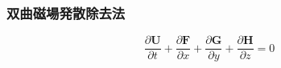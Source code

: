 








\clearpage
\subsubsection{双曲磁場発散除去法}



\begin{equation}
    \frac{\partial \bm{ U}}{\partial t} 
    + \frac{\partial \bm{ F}}{\partial x}
    + \frac{\partial \bm{ G}}{\partial y}
    + \frac{\partial \bm{ H}}{\partial z}
    =0
\end{equation}
